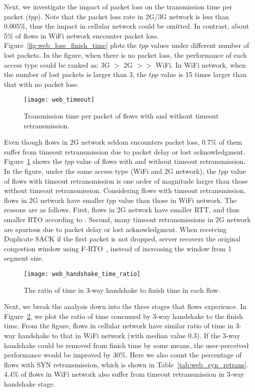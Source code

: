 Next, we investigate the impact of packet loss on the transmission time per packet ($tpp$). Note that the packet loss rate in 2G/3G network is less than 0.005\%, thus the impact in cellular network could be omitted. In contrast, about 5\% of flows in WiFi network encounter packet loss. Figure~\ref{fig:web_loss_finish_time} plots the $tpp$ values under different number of lost packets. In the figure, when there is no packet loss, the performance of each access type could be ranked as: 3G $>$ 2G $>>$ WiFi. In WiFi network, when the number of lost packets is larger than 3, the $tpp$ value is 15 times larger than that with no packet loss.

\begin{figure}[th]
\centering
	\texttt{[image: web\_timeout]}
\caption{Transmission time per packet of flows with and without timeout retransmission.}
\label{fig:web_timeout}
\end{figure}

Even though flows in 2G network seldom encounters packet loss, 0.7\% of them suffer from timeout retransmission due to packet delay or lost acknowledgment. Figure~\ref{fig:web_timeout} shows the $tpp$ value of flows with and without timeout retransmission. In the figure, under the same access type (WiFi and 2G network), the $tpp$ value of flows with timeout retransmission is one order of magnitude larger than those without timeout retransmission. Considering flows with timeout retransmission, flows in 2G network have smaller $tpp$ value than those in WiFi network. The reasons are as follows. First, flows in 2G network have smaller RTT, and thus smaller RTO according to \cite{rfc62982011computing}. Second, many timeout retransmissions in 2G network are spurious due to packet delay or lost acknowledgment. When receiving Duplicate SACK if the first packet is not dropped, server recovers the original congestion window using F-RTO~\cite{sarolahti2005forward}, instead of increasing the window from 1 segment size.

\begin{figure}[th]
\centering
\texttt{[image: web\_handshake\_time\_ratio]}
\caption{The ratio of time in 3-way handshake to finish time in each flow.}
\label{fig:web_handshake_ratio}
\end{figure}

Next, we break the analysis down into the three stages that flows experience. In Figure~\ref{fig:web_handshake_ratio}, we plot the ratio of time consumed by 3-way handshake to the finish time. From the figure, flows in cellular network have similar ratio of time in 3-way handshake to that in WiFi network (with median value 0.3). If the 3-way handshake could be removed from finish time by some means, the user-perceived performance would be improved by 30\%. Here we also count the percentage of flows with SYN retransmission, which is shown in Table~\ref{tab:web_syn_retrans}. 4.4\% of flows in WiFi network also suffer from timeout retransmission in 3-way handshake stage.

